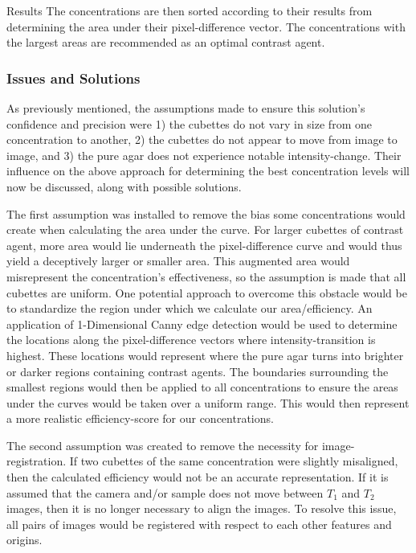 \documentclass[a4paper,12pt]{article}
\begin{document}
\begin{section}{Results}
The concentrations are then sorted according to their results from determining the area under their pixel-difference vector. The concentrations with the largest areas are recommended as an optimal contrast agent.

\subsubsection{Issues and Solutions}

As previously mentioned, the assumptions made to ensure this solution's confidence and precision were 1) the cubettes do not vary in size from one concentration to another, 2) the cubettes do not appear to move from image to image, and 3) the pure agar does not experience notable intensity-change. Their influence on the above approach for determining the best concentration levels will now be discussed, along with possible solutions.

The first assumption was installed to remove the bias some concentrations would create when calculating the area under the curve. For larger cubettes of contrast agent, more area would lie underneath the pixel-difference curve and would thus yield a deceptively larger or smaller area. This augmented area would misrepresent the concentration's effectiveness, so the assumption is made that all cubettes are uniform. One potential approach to overcome this obstacle would be to standardize the region under which we calculate our area/efficiency. An application of 1-Dimensional Canny edge detection would be used to determine the locations along the pixel-difference vectors where intensity-transition is highest. These locations would represent where the pure agar turns into brighter or darker regions containing contrast agents. The boundaries surrounding the smallest regions would then be applied to all concentrations to ensure the areas under the curves would be taken over a uniform range. This would then represent a more realistic efficiency-score for our concentrations.

The second assumption was created to remove the necessity for image-registration. If two cubettes of the same concentration were slightly misaligned, then the calculated efficiency would not be an accurate representation. If it is assumed that the camera and/or sample does not move between $T_1$ and $T_2$ images, then it is no longer necessary to align the images. To resolve this issue, all pairs of images would be registered with respect to each other features and origins.


\end{section}
\end{document}
